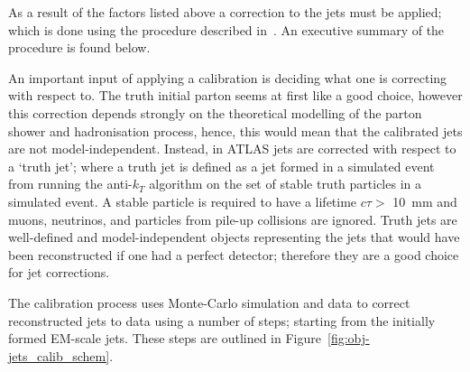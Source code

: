As a result of the factors listed above a correction to the jets must be applied;
which is done using the procedure described in~\cite{obj-jets_calib_run2}.
An executive summary of the procedure is found below.

An important input of applying a calibration is deciding what one is correcting with respect to.
The truth initial parton seems at first like a good choice,
however this correction depends strongly on the theoretical modelling of the parton shower and hadronisation process,
hence, this would mean that the calibrated jets are not model-independent.
Instead, in ATLAS jets are corrected with respect to a `truth jet';
where a truth jet is defined as a jet formed in a simulated event from running the anti-$k_T$ algorithm on the set of stable truth particles in a simulated event.
A stable particle is required to have a lifetime $c\tau >$ \SI{10}{\milli\metre} and muons, neutrinos, and particles from pile-up collisions are ignored.
Truth jets are well-defined and model-independent objects representing the jets that would have been reconstructed if one had a perfect detector;
therefore they are a good choice for jet corrections.

The calibration process uses Monte-Carlo simulation and data to correct reconstructed jets to data using a number of steps;
starting from the initially formed EM-scale jets.
These steps are outlined in Figure~\ref{fig:obj-jets_calib_schem}.

